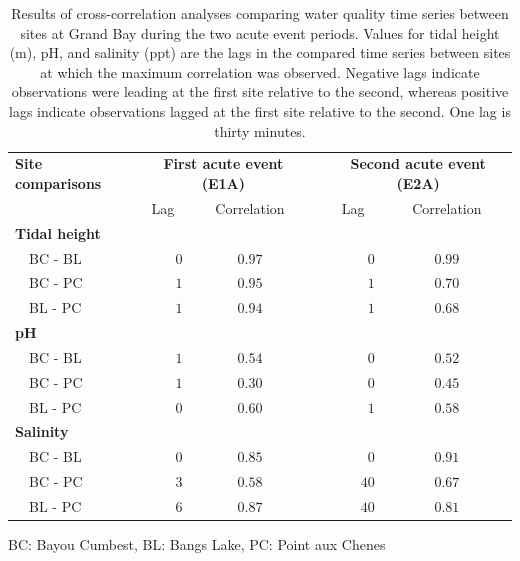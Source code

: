 \documentclass[letterpaper,12pt]{article}\usepackage[]{graphicx}\usepackage[]{color}
\begin{document}
\begin{table}[!tbp]
\caption{Results of cross-correlation analyses comparing water quality time series between sites at Grand Bay during the two acute event periods.  Values for tidal height (m), pH, and salinity (ppt) are the lags in the compared time series between sites at which the maximum correlation was observed.  Negative lags indicate observations were leading at the first site relative to the second, whereas positive lags indicate observations lagged at the first site relative to the second.  One lag is thirty minutes.\label{tab:ccfwq}} 
\begin{center}
\begin{tabular}{lrccrc}
\hline\hline
\multicolumn{1}{l}{\bfseries Site comparisons}&\multicolumn{2}{c}{\bfseries First acute event (E1A)}&\multicolumn{1}{c}{\bfseries }&\multicolumn{2}{c}{\bfseries Second acute event (E2A)}\tabularnewline
\cline{2-3} \cline{5-6}
\multicolumn{1}{l}{}&\multicolumn{1}{c}{Lag}&\multicolumn{1}{c}{Correlation}&\multicolumn{1}{c}{}&\multicolumn{1}{c}{Lag}&\multicolumn{1}{c}{Correlation}\tabularnewline
\hline
{\bfseries Tidal height}&&&&&\tabularnewline
~~BC - BL&$0$&$0.97$&&$ 0$&$0.99$\tabularnewline
~~BC - PC&$1$&$0.95$&&$ 1$&$0.70$\tabularnewline
~~BL - PC&$1$&$0.94$&&$ 1$&$0.68$\tabularnewline
\hline
{\bfseries pH}&&&&&\tabularnewline
~~BC - BL&$1$&$0.54$&&$ 0$&$0.52$\tabularnewline
~~BC - PC&$1$&$0.30$&&$ 0$&$0.45$\tabularnewline
~~BL - PC&$0$&$0.60$&&$ 1$&$0.58$\tabularnewline
\hline
{\bfseries Salinity}&&&&&\tabularnewline
~~BC - BL&$0$&$0.85$&&$ 0$&$0.91$\tabularnewline
~~BC - PC&$3$&$0.58$&&$40$&$0.67$\tabularnewline
~~BL - PC&$6$&$0.87$&&$40$&$0.81$\tabularnewline
\hline
\end{tabular}\end{center}

\footnotesize BC: Bayou Cumbest, BL: Bangs Lake, PC: Point aux Chenes\end{table}

\clearpage
\end{document}
